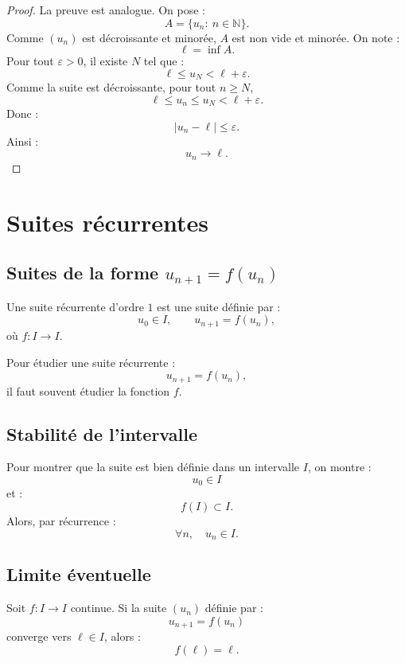 \documentclass[11pt,a4paper]{article}
\newcommand{\N}{\mathbb N}
\begin{document}
\begin{proof}
La preuve est analogue.  
On pose :
\[
A=\{u_n:\ n\in\N\}.
\]
Comme \((u_n)\) est décroissante et minorée, \(A\) est non vide et minorée.  
On note :
\[
\ell=\inf A.
\]
Pour tout \(\varepsilon>0\), il existe \(N\) tel que :
\[
\ell\leq u_N<\ell+\varepsilon.
\]
Comme la suite est décroissante, pour tout \(n\geq N\),
\[
\ell\leq u_n\leq u_N<\ell+\varepsilon.
\]
Donc :
\[
|u_n-\ell|\leq\varepsilon.
\]
Ainsi :
\[
u_n\to\ell.
\]
\end{proof}

\section{Suites récurrentes}

\subsection{Suites de la forme \(u_{n+1}=f(u_n)\)}

\begin{definitionbox}
Une suite récurrente d'ordre \(1\) est une suite définie par :
\[
u_0\in I,
\qquad
u_{n+1}=f(u_n),
\]
où \(f:I\to I\).
\end{definitionbox}

\begin{retenirbox}
Pour étudier une suite récurrente :
\[
u_{n+1}=f(u_n),
\]
il faut souvent étudier la fonction \(f\).
\end{retenirbox}

\subsection{Stabilité de l'intervalle}

\begin{methodbox}
Pour montrer que la suite est bien définie dans un intervalle \(I\), on montre :
\[
u_0\in I
\]
et :
\[
f(I)\subset I.
\]
Alors, par récurrence :
\[
\forall n,\quad u_n\in I.
\]
\end{methodbox}

\subsection{Limite éventuelle}

\begin{theorembox}
Soit \(f:I\to I\) continue.  
Si la suite \((u_n)\) définie par :
\[
u_{n+1}=f(u_n)
\]
converge vers \(\ell\in I\), alors :
\[
f(\ell)=\ell.
\]
\end{theorembox}
\end{document}
